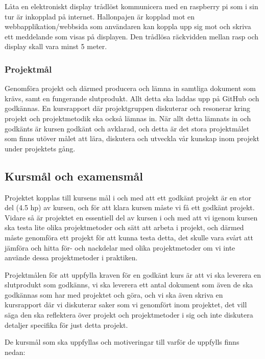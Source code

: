\documentclass[11pt]{article}
\begin{document}
Låta en elektroniskt display trådlöst kommunicera med en raspberry pi
som i sin tur är inkopplad på internet. Hallonpajen är kopplad mot en
webbapplikation/webbsida som användaren kan koppla upp sig mot och
skriva ett meddelande som visas på displayen. Den trådlösa räckvidden
mellan rasp och display skall vara minst 5 meter.

\subsubsection{Projektmål}
\label{sec:org3f8a919}

Genomföra projekt och därmed producera och lämna in samtliga dokument
som krävs, samt en fungerande slutprodukt. Allt detta ska laddas upp på
GitHub och godkännas. En kursrapport där projektgruppen diskuterar och
resonerar kring projekt och projektmetodik ska också lämnas in. När allt
detta lämnats in och godkänts är kursen godkänt och avklarad, och detta
är det stora projektmålet som finns utöver målet att lära, diskutera och
utveckla vår kunskap inom projekt under projektets gång.

\subsection{Kursmål och examensmål}
\label{sec:org6cb4ab2}
Projektet kopplas till kursens mål i och med att ett godkänt projekt är
en stor del (4.5 hp) av kursen, och för att klara kursen måste vi få ett
godkänt projekt. Vidare så är projektet en essentiell del av kursen i
och med att vi igenom kursen ska testa lite olika projektmetoder och
sätt att arbeta i projekt, och därmed måste genomföra ett projekt för
att kunna testa detta, det skulle vara svårt att jämföra och hitta för-
och nackdelar med olika projektmetoder om vi inte använde dessa
projektmetoder i praktiken.

Projektmålen för att uppfylla kraven för en godkänt kurs är att vi ska
leverera en slutprodukt som godkänns, vi ska leverera ett antal dokument
som även de ska godkännas som har med projektet och göra, och vi ska
även skriva en kursrapport där vi diskuterar saker som vi genomfört inom
projektet, det vill säga den ska reflektera över projekt och
projektmetoder i sig och inte diskutera detaljer specifika för just
detta projekt.

De kursmål som ska uppfyllas och motiveringar till varför de uppfylls
finns nedan:
\end{document}
